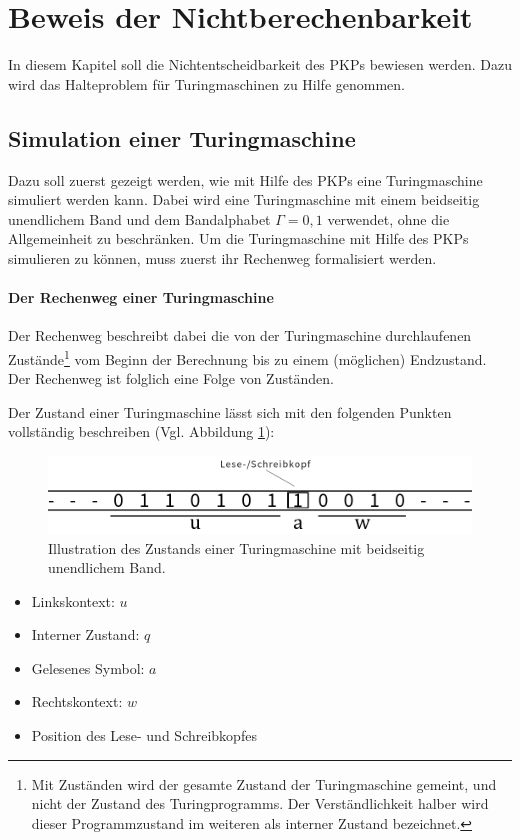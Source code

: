 \documentclass[]{scrartcl}
\begin{document}
\section{Beweis der Nichtberechenbarkeit}
	In diesem Kapitel soll die Nichtentscheidbarkeit des PKPs bewiesen werden. Dazu wird das Halteproblem für Turingmaschinen zu Hilfe genommen.

	\subsection{Simulation einer Turingmaschine}
		Dazu soll zuerst gezeigt werden, wie mit Hilfe des PKPs eine Turingmaschine simuliert werden kann. Dabei wird eine Turingmaschine mit einem beidseitig unendlichem Band und dem Bandalphabet $\varGamma = {0,1}$ verwendet, ohne die Allgemeinheit zu beschränken. Um die Turingmaschine mit Hilfe des PKPs simulieren zu können, muss zuerst ihr Rechenweg formalisiert werden. 
		
		
		\paragraph{Der Rechenweg einer Turingmaschine}
			Der Rechenweg beschreibt dabei die von der Turingmaschine durchlaufenen Zustände\footnote{Mit Zuständen wird der gesamte Zustand der Turingmaschine gemeint, und nicht der Zustand des Turingprogramms. Der Verständlichkeit halber wird dieser Programmzustand im weiteren als interner Zustand bezeichnet.} vom Beginn der Berechnung bis zu einem (möglichen) Endzustand. Der Rechenweg ist folglich eine Folge von Zuständen.
			
			Der Zustand einer Turingmaschine lässt sich mit den folgenden Punkten vollständig beschreiben (Vgl. Abbildung \ref{img-turingsnapshot}):
			\begin{figure}
				\centering
				\includegraphics[width=0.85\linewidth]{../abbildungen/turing-snapshot}
				\caption{Illustration des Zustands einer Turingmaschine mit beidseitig unendlichem Band.}
				\label{img-turingsnapshot}
			\end{figure}
			
			\begin{itemize}
				\item Linkskontext: $u$
				\item Interner Zustand: $q$
				\item Gelesenes Symbol: $a$
				\item Rechtskontext: $w$
				\item Position des Lese- und Schreibkopfes
			\end{itemize}
			
\end{document}
